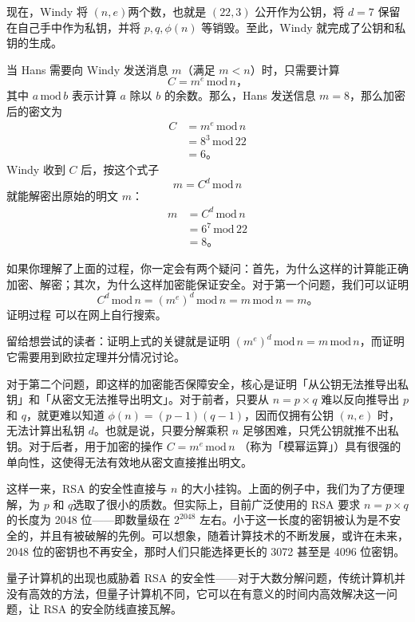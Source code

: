 现在，Windy 将 $(n, e)$两个数，也就是 $(22, 3)$ 公开作为公钥，将 $d=7$ 保留在自己手中作为私钥，并将 $p, q, \phi(n)$ 等销毁。至此，Windy 就完成了公钥和私钥的生成。

当 Hans 需要向 Windy 发送消息 $m$（满足 $m<n$）时，只需要计算
\[C= m^e\,\mathrm{mod}\,n\text{，}\]
其中 $a\,\mathrm{mod}\,b$ 表示计算 $a$ 除以 $b$ 的余数。那么，Hans 发送信息 $m=8$，那么加密后的密文为
\begin{align*}
  C &= m^e\,\mathrm{mod}\,n \\
  &= 8^3\,\mathrm{mod}\,22 \\
  &= 6\text{。}
\end{align*}
Windy 收到 $C$ 后，按这个式子
\[m= C^d\,\mathrm{mod}\,n\]
就能解密出原始的明文 $m$：
\begin{align*}
  m &= C^d\,\mathrm{mod}\,n \\
  &= 6^7\,\mathrm{mod}\,22 \\
  &= 8\text{。}
\end{align*}

如果你理解了上面的过程，你一定会有两个疑问：首先，为什么这样的计算能正确加密、解密；其次，为什么这样加密能保证安全。对于第一个问题，我们可以证明
\[C^d\,\mathrm{mod}\,n=(m^e)^d\,\mathrm{mod}\,n=m\,\mathrm{mod}\,n=m\text{。}\]
证明过程  可以在网上自行搜索。

\begin{note}
  留给想尝试的读者：证明上式的关键就是证明 $(m^e)^d\,\mathrm{mod}\,n=m\,\mathrm{mod}\,n$，而证明它需要用到欧拉定理并分情况讨论。
\end{note}

对于第二个问题，即这样的加密能否保障安全，核心是证明「从公钥无法推导出私钥」和「从密文无法推导出明文」。对于前者，只要从 $n=p\times q$ 难以反向推导出 $p$ 和 $q$，就更难以知道 $\phi(n)=(p-1)(q-1)$，因而仅拥有公钥 $(n, e)$ 时，无法计算出私钥 $d$。也就是说，只要分解乘积 $n$ 足够困难，只凭公钥就推不出私钥。对于后者，用于加密的操作 $C= m^e\,\mathrm{mod}\,n$ （称为「模幂运算」）具有很强的单向性，这使得无法有效地从密文直接推出明文。

这样一来，RSA 的安全性直接与 $n$ 的大小挂钩。上面的例子中，我们为了方便理解，为 $p$ 和 $q$选取了很小的质数。但实际上，目前广泛使用的 RSA 要求 $n=p\times q$ 的长度为 2048 位——即数量级在 $2^{2048}$ 左右。小于这一长度的密钥被认为是不安全的，并且有被破解的先例。可以想象，随着计算技术的不断发展，或许在未来，2048 位的密钥也不再安全，那时人们只能选择更长的 3072 甚至是 4096 位密钥。

\begin{note}
  量子计算机的出现也威胁着 RSA 的安全性——对于大数分解问题，传统计算机并没有高效的方法，但量子计算机不同，它可以在有意义的时间内高效解决这一问题，让 RSA 的安全防线直接瓦解。
\end{note}

